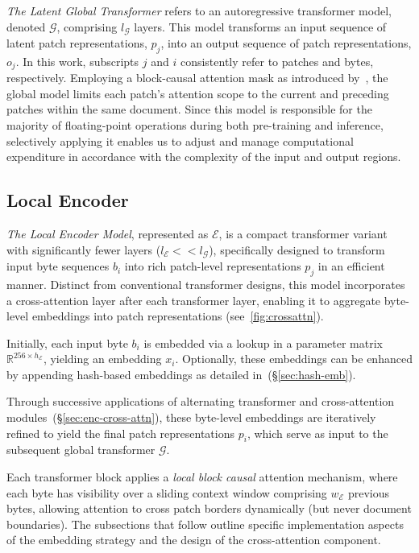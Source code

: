 \textit{The Latent Global Transformer} refers to an autoregressive transformer model, denoted $\mathcal{G}$, comprising $l_{\mathcal{G}}$ layers. This model transforms an input sequence of latent patch representations, $p_j$, into an output sequence of patch representations, $o_j$. In this work, subscripts $j$ and $i$ consistently refer to patches and bytes, respectively. Employing a block-causal attention mask as introduced by~\citet{dubey2024llama}, the global model limits each patch’s attention scope to the current and preceding patches within the same document. Since this model is responsible for the majority of floating-point operations during both pre-training and inference, selectively applying it enables us to adjust and manage computational expenditure in accordance with the complexity of the input and output regions.

\subsection{Local Encoder}
\label{section:local}

\textit{The Local Encoder Model}, represented as $\mathcal{E}$, is a compact transformer variant with significantly fewer layers ($l_{\mathcal{E}} << l_{\mathcal{G}}$), specifically designed to transform input byte sequences $b_i$ into rich patch-level representations $p_j$ in an efficient manner. Distinct from conventional transformer designs, this model incorporates a cross-attention layer after each transformer layer, enabling it to aggregate byte-level embeddings into patch representations (see~\autoref{fig:crossattn}).

Initially, each input byte $b_i$ is embedded via a lookup in a parameter matrix $\mathbb{R}^{256 \times h_{\mathcal{E}}}$, yielding an embedding $x_i$. Optionally, these embeddings can be enhanced by appending hash-based embeddings as detailed in~(\S\ref{sec:hash-emb}).

Through successive applications of alternating transformer and cross-attention modules~(\S\ref{sec:enc-cross-attn}), these byte-level embeddings are iteratively refined to yield the final patch representations $p_i$, which serve as input to the subsequent global transformer $\mathcal{G}$.

Each transformer block applies a \textit{local block causal} attention mechanism, where each byte has visibility over a sliding context window comprising $w_{\mathcal{E}}$ previous bytes, allowing attention to cross patch borders dynamically (but never document boundaries). The subsections that follow outline specific implementation aspects of the embedding strategy and the design of the cross-attention component.

